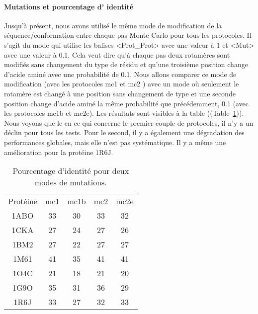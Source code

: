    \paragraph{Mutations et pourcentage d' identité} 
Jusqu'à présent, nous avons utilisé le même mode de modification de la séquence/conformation entre chaque pas Monte-Carlo pour tous les protocoles. Il s'agit du mode qui utilise les balises <Prot\_Prot> avec une valeur à 1 et <Mut> avec une valeur à 0.1. Cela veut dire qu'à chaque pas deux rotamères sont modifiés sans changement du type de résidu et qu'une troisième position change d'acide aminé avec une probabilité de 0.1. Nous allons comparer ce mode de modification (avec les protocoles mc1 et mc2 ) avec un mode où seulement  le rotamère est changé à une position sans changement de type et une seconde position change d'acide aminé la même probabilité que précédemment, 0.1 (avec les protocoles mc1b et mc2e). Les résultats sont visibles à la table ((Table~\ref{tab:mut_ident})). Nous voyons que le en ce qui concerne le premier couple de protocoles, il n'y a un déclin pour tous les tests. Pour le second, il y a également une dégradation des performances globales, mais elle n'est pas systématique. Il y a même une amélioration pour la protéine 1R6J.  


    \begin{table}[!htbp]
      \centering
      
      \begin{tabular}{ccccc}      
          \toprule
          Protéine & mc1 & mc1b & mc2 & mc2e \\
          \cmidrule{1-3}
          
          1ABO & 33 & 30 & 33 & 32 \\      
          1CKA & 27 & 24 & 27 & 26 \\
          1BM2 & 27 & 22 & 27 & 27 \\
          1M61 & 41 & 35 & 41 & 41 \\
          1O4C & 21 & 18 & 21 & 20 \\
          1G9O & 35 & 31 & 36 & 29 \\
          1R6J & 33 & 27 & 32 & 33 \\ 
          \bottomrule
          
        \end{tabular}
        
        \caption{Pourcentage d'identité pour deux modes de mutations. }      
\label{tab:mut_ident}        
        \end{table}


